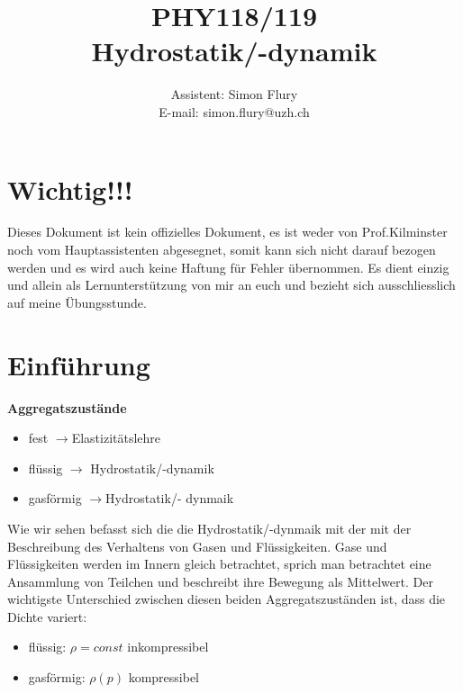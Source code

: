 \documentclass[12pt]{article}
\begin{document}
\title{PHY118/119 \\ {\bf Hydrostatik/-dynamik}}
\author{Assistent: Simon Flury \\E-mail: simon.flury@uzh.ch\\ }
\maketitle

\section{Wichtig!!!}
Dieses Dokument ist kein offizielles Dokument, es ist weder von Prof.Kilminster noch vom Hauptassistenten abgesegnet, somit kann sich nicht darauf bezogen werden und es wird auch keine Haftung für Fehler übernommen. Es dient einzig und allein als Lernunterstützung von mir an euch und bezieht sich ausschliesslich auf meine Übungsstunde.

\section{Einführung}

\textbf{Aggregatszustände}

\begin{itemize}
\item fest $\rightarrow$Elastizitätslehre
\item flüssig $\rightarrow$ Hydrostatik/-dynamik
\item gasförmig $\rightarrow $Hydrostatik/- dynmaik
\end{itemize}

 Wie wir sehen befasst sich die die Hydrostatik/-dynmaik mit der mit der Beschreibung des Verhaltens von Gasen und Flüssigkeiten. Gase und Flüssigkeiten werden im Innern gleich betrachtet, sprich man betrachtet eine Ansammlung von Teilchen und beschreibt ihre Bewegung als Mittelwert. Der wichtigste Unterschied zwischen diesen beiden Aggregatszuständen ist, dass die Dichte variert:
 \begin{itemize}
 \item flüssig: $\rho = const$ inkompressibel
 \item gasförmig: $\rho(p)$ kompressibel
 \end{itemize}
 \clearpage
 
\end{document}
